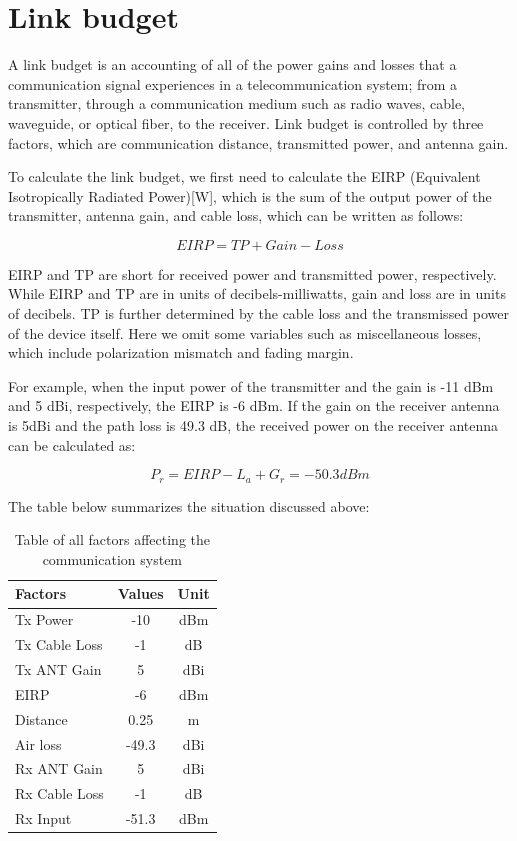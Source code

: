 \documentclass[a4paper,12pt]{report}
\begin{document}
\section{Link budget}

A link budget is an accounting of all of the power gains and losses
that a communication signal experiences in a telecommunication system;
from a transmitter, through a communication medium such as radio waves,
cable, waveguide, or optical fiber, to the receiver.
Link budget is controlled by three factors, 
which are communication distance, transmitted power, and antenna gain.

To calculate the link budget,
we first need to calculate the EIRP (Equivalent Isotropically Radiated Power)[W],
which is the sum of the output power of the transmitter, antenna gain, and cable loss,
which can be written as follows:

\begin{equation}
  EIRP = TP + Gain - Loss
\end{equation}

EIRP and TP are short for received power and transmitted power, respectively.
While EIRP and TP are in units of decibels-milliwatts,
gain and loss are in units of decibels.
TP is further determined by the cable loss and the transmissed power
of the device itself.
Here we omit some variables such as miscellaneous losses,
which include polarization mismatch and fading margin.

For example, when the input power of the transmitter and the gain is -11 dBm and 5 dBi,
respectively, the EIRP is -6 dBm.
If the gain on the receiver antenna is 5dBi and
the path loss is 49.3 dB,
the received power on the receiver antenna can be calculated as:

\begin{equation}
  P_r = EIRP - L_{a} + G_r = -50.3 dBm
\end{equation}

The table below summarizes the situation discussed above:

\begin{table}[h]
  \centering
  \caption{Table of all factors affecting the communication system}
  \label{table:communication_system_factors}
  \begin{tabular}[]{lcc}
    \hline
    Factors & Values & Unit \\
    \hline\hline
    Tx Power & -10 & dBm \\
    \hline
    Tx Cable Loss & -1 & dB \\
    \hline
    Tx ANT Gain & 5 & dBi \\
    \hline
    EIRP & -6 & dBm \\
    \hline
    Distance & 0.25 & m \\
    \hline
    Air loss & -49.3 & dBi \\
    \hline
    Rx ANT Gain & 5 & dBi \\
    \hline
    Rx Cable Loss & -1 & dB \\
    \hline
    \hline
    Rx Input & -51.3 & dBm \\
    \hline
  \end{tabular}
\end{table}
\end{document}
